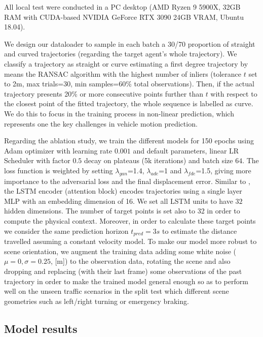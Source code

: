 All local test were conducted in a PC desktop (AMD Ryzen 9 5900X, 32GB RAM with CUDA-based NVIDIA GeForce RTX 3090 24GB VRAM, Ubuntu 18.04).

We design our dataloader to sample in each batch a 30/70 proportion of straight and curved trajectories (regarding the target agent's whole trajectory). We classify a trajectory as straight or curve estimating a first degree trajectory by means the RANSAC algorithm with the highest number of inliers (tolerance $t$ set to 2m, max trials=30, min samples=60\% total observations). Then, if the actual trajectory presents 20\% or more consecutive points further than $t$ with respect to the closest point of the fitted trajectory, the whole sequence is labelled as curve. We do this to focus in the training process in non-linear prediction, which represents one the key challenges in vehicle motion prediction. 

Regarding the ablation study, we train the different models for 150 epochs using Adam optimizer with learning rate $0.001$ and default parameters, linear LR Scheduler with factor $0.5$ decay on plateaus (5k iterations) and batch size $64$. The loss function is weighted by setting $\lambda_{gan}$=1.4, $\lambda_{ade}$=1 and $\lambda_{fde}$=1.5, giving more importance to the adversarial loss and the final displacement error. Similar to \cite{sadeghian2019sophie}, the LSTM encoder (attention block) encodes trajectories using a single layer MLP with an embedding dimension of 16. We set all LSTM units to have $32$ hidden dimensions. The number of target points is set also to 32 in order to compute the physical context. Moreover, in order to calculate these target points we consider the same prediction horizon $t_{pred}=3s$ to estimate the distance travelled assuming a constant velocity model. To make our model more robust to scene orientation, we augment the training data adding some white noise ($\mu=0, \sigma=0.25$, [m]) to the observation data, rotating the scene and also dropping and replacing (with their last frame) some observations of the past trajectory in order to make the trained model general enough so as to perform well on the unseen traffic scenarios in the split test which different scene geometries such as left/right turning or emergency braking.%

\subsection{Model results}

